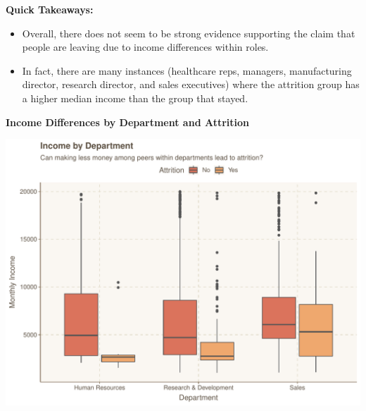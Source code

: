 \documentclass[
]{article}
\newenvironment{Shaded}{\begin{snugshade}}{\end{snugshade}}
\newcommand{\DataTypeTok}[1]{\textcolor[rgb]{0.13,0.29,0.53}{#1}}
\newcommand{\KeywordTok}[1]{\textcolor[rgb]{0.13,0.29,0.53}{\textbf{#1}}}
\newcommand{\NormalTok}[1]{#1}
\newcommand{\OperatorTok}[1]{\textcolor[rgb]{0.81,0.36,0.00}{\textbf{#1}}}
\newcommand{\StringTok}[1]{\textcolor[rgb]{0.31,0.60,0.02}{#1}}
\providecommand{\tightlist}{%
  \setlength{\itemsep}{0pt}\setlength{\parskip}{0pt}}
\begin{document}
\textbf{Quick Takeaways:}

\begin{itemize}
\tightlist
\item
  Overall, there does not seem to be strong evidence supporting the
  claim that people are leaving due to income differences within roles.
\item
  In fact, there are many instances (healthcare reps, managers,
  manufacturing director, research director, and sales executives) where
  the attrition group has a higher median income than the group that
  stayed.
\end{itemize}

\textbf{Income Differences by Department and Attrition}

\begin{Shaded}
\end{Shaded}

\includegraphics{figures/Income Differences by Department and Attrition-1.pdf}
\end{document}
